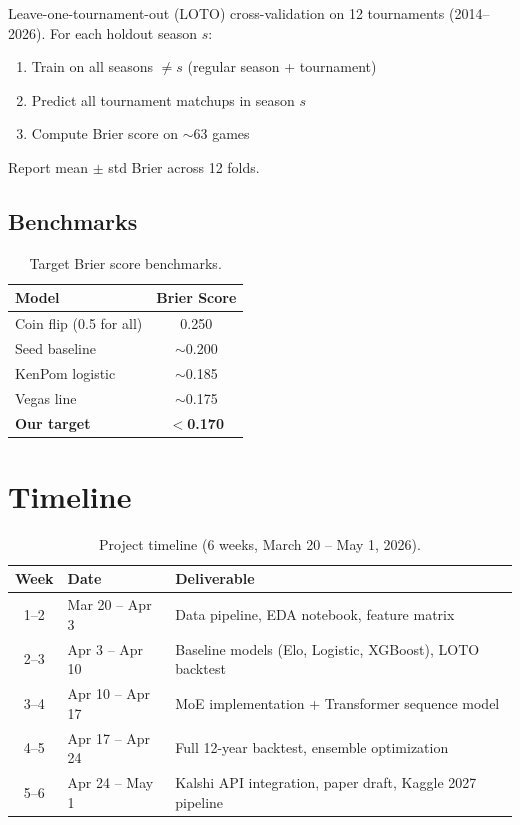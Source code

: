 \documentclass[11pt,a4paper]{article}
\begin{document}
Leave-one-tournament-out (LOTO) cross-validation on 12 tournaments (2014--2026). For each holdout season $s$:
\begin{enumerate}[nosep]
    \item Train on all seasons $\neq s$ (regular season + tournament)
    \item Predict all tournament matchups in season $s$
    \item Compute Brier score on $\sim$63 games
\end{enumerate}
Report mean $\pm$ std Brier across 12 folds.

\subsection{Benchmarks}

\begin{table}[h]
\centering
\caption{Target Brier score benchmarks.}
\label{tab:benchmarks}
\begin{tabular}{@{}lc@{}}
\toprule
\textbf{Model} & \textbf{Brier Score} \\
\midrule
Coin flip (0.5 for all) & 0.250 \\
Seed baseline & $\sim$0.200 \\
KenPom logistic & $\sim$0.185 \\
Vegas line & $\sim$0.175 \\
\textbf{Our target} & $<$\textbf{0.170} \\
\bottomrule
\end{tabular}
\end{table}

\newpage

\section{Timeline}

\begin{table}[h]
\centering
\caption{Project timeline (6 weeks, March 20 -- May 1, 2026).}
\label{tab:timeline}
\begin{tabular}{@{}clp{8cm}@{}}
\toprule
\textbf{Week} & \textbf{Date} & \textbf{Deliverable} \\
\midrule
1--2 & Mar 20 -- Apr 3 & Data pipeline, EDA notebook, feature matrix \\
2--3 & Apr 3 -- Apr 10 & Baseline models (Elo, Logistic, XGBoost), LOTO backtest \\
3--4 & Apr 10 -- Apr 17 & MoE implementation + Transformer sequence model \\
4--5 & Apr 17 -- Apr 24 & Full 12-year backtest, ensemble optimization \\
5--6 & Apr 24 -- May 1 & Kalshi API integration, paper draft, Kaggle 2027 pipeline \\
\bottomrule
\end{tabular}
\end{table}
\end{document}
